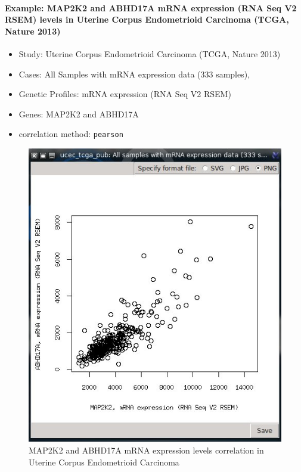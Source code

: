 \documentclass[a4paper]{article}
\begin{document}
 
 \paragraph{Example: MAP2K2 and ABHD17A mRNA expression (RNA Seq V2 RSEM) levels in Uterine Corpus Endometrioid Carcinoma (TCGA, Nature 2013)}
 
 \begin{itemize}
    \item Study:  Uterine Corpus Endometrioid Carcinoma (TCGA, Nature 2013)
    \item Cases: All Samples with mRNA expression data (333 samples),
    \item Genetic Profiles: mRNA expression (RNA Seq V2 RSEM)
    \item Genes: MAP2K2 and ABHD17A
    \item correlation method: \texttt{pearson}
 \end{itemize}
 
 
 \begin{figure}[!ht]
  \centering
 \includegraphics[scale=0.5]{image/plot3.jpeg}
 \caption{MAP2K2 and ABHD17A mRNA expression levels correlation in Uterine Corpus Endometrioid Carcinoma}
 \label{plot2}
 \end{figure}
 
\end{document}
